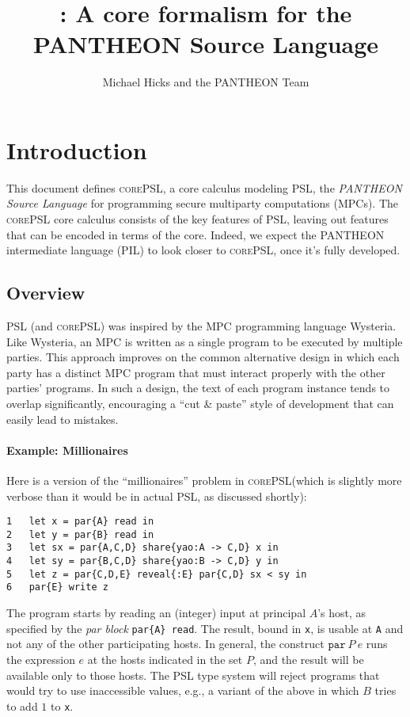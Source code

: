 \documentclass[10pt]{article}
\title{\lang: A core formalism for the PANTHEON Source Language}
\author{Michael Hicks and the PANTHEON Team}
\newcommand{\kw}[1]{\ensuremath{\mathtt{#1}}}
\newcommand{\epar}[2]{\ensuremath{\kw{par}~{#1}~{#2}}}
\newcommand{\lang}{\textsc{corePSL}\xspace}
\begin{document}
\maketitle

\section{Introduction}

This document defines \lang, a core calculus modeling PSL, the
\emph{PANTHEON Source Language} for programming secure multiparty
computations (MPCs). The \lang core calculus consists of the key features of PSL,
leaving out features that can be encoded in terms of the core. Indeed,
we expect the PANTHEON intermediate language (PIL) to look closer to
\lang, once it's fully developed.

\subsection{Overview}
\label{sec:overview}

PSL (and \lang) was inspired by the MPC programming language
Wysteria. Like Wysteria, an MPC is written as a single program to be
executed by multiple parties. This approach improves on the common
alternative design in which each party has a distinct MPC
program that must interact properly with the other parties'
programs. In such a design, the text of each program instance tends to
overlap significantly, encouraging a ``cut \& paste'' style of
development that can easily lead to mistakes.

\paragraph{Example: Millionaires}

Here is a version of the ``millionaires'' problem in \lang (which is
slightly more verbose than it would be in actual PSL, as discussed shortly):
\begin{verbatim}
1   let x = par{A} read in
2   let y = par{B} read in
3   let sx = par{A,C,D} share{yao:A -> C,D} x in
4   let sy = par{B,C,D} share{yao:B -> C,D} y in
5   let z = par{C,D,E} reveal{:E} par{C,D} sx < sy in
6   par{E} write z
\end{verbatim}
The program starts by reading an (integer) input at principal $A$'s
host, as specified by the \emph{par block} \texttt{par\{A\} read}. The
result, bound in \texttt{x}, is usable at \texttt{A} and not any of
the other participating hosts. In  
general, the construct $\epar{P}{e}$ runs the expression $e$ at the
hosts indicated in the set $P$, and the result will be available only
to those hosts. The PSL type system will reject programs that would
try to use inaccessible values, e.g., a variant of the above in
which $B$ tries to add $1$ to \texttt{x}.
\end{document}
